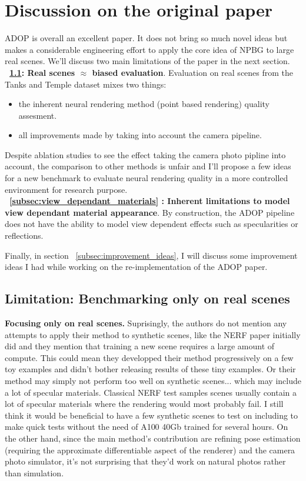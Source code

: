 \section{Discussion on the original paper}
\label{sec:discussion}
ADOP\cite{ruckert2022adop} is overall an excellent paper. It does not bring so much novel ideas but makes a considerable engineering effort to apply the core idea of NPBG \cite{Aliev2020} to large real scenes.
We'll discuss two main limitations of the paper in the next section.\\
\noindent \textbf{~\ref{subsec:limits_real_scenes}{: Real scenes $\approx$ biased evaluation}}. Evaluation on real scenes from the Tanks and Temple dataset \cite{Knapitsch2017TanksAndTemples} mixes two things:
\begin{itemize}
    \item the inherent neural rendering method (point based rendering) quality assesment.
    \item all improvements made by taking into account the camera pipeline.
\end{itemize}
Despite ablation studies to see the effect taking the camera photo pipline into account, the comparison to other methods is unfair and I'll propose a few ideas for a new benchmark to evaluate neural rendering quality in a more controlled environment for research purpose.\\
\noindent \textbf{~\ref{subsec:view_dependant_materials}{ : Inherent limitations to model view dependant material appearance}}. By construction, the ADOP pipeline does not have the ability to model view dependent effects such as specularities or reflections.

Finally, in section ~\ref{subsec:improvement_ideas}, I will discuss some improvement ideas I had while working on the re-implementation of the ADOP paper.

\subsection{Limitation: Benchmarking only on real scenes}
\label{subsec:limits_real_scenes}
\noindent \textbf{Focusing only on real scenes.}
Suprisingly, the authors do not mention any attempts to apply their method to synthetic scenes, like the NERF paper initially did and they mention that training a new scene requires a large amount of compute. This could mean they developped their method progressively on a few toy examples and didn't bother releasing results of these tiny examples. Or their method may simply not perform too well on synthetic scenes... which may include a lot of specular materials. Classical NERF test samples scenes usually contain a lot of specular materials where the rendering would most probably fail. I still think it would be beneficial to have a few synthetic scenes to test on including to make quick tests without the need of A100 40Gb trained for several hours.
On the other hand, since the main method's contribution are refining pose estimation (requiring the approximate differentiable aspect of the renderer) and the camera photo simulator, it's not surprising that they'd work on natural photos rather than simulation. 

